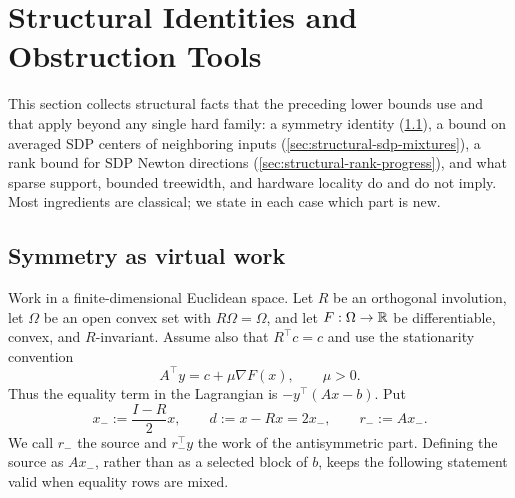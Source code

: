 \section{Structural Identities and Obstruction Tools}
\label{sec:structural-tools}

This section collects structural facts that the preceding lower bounds use
and that apply beyond any single hard family: a symmetry identity
(\cref{sec:structural-symmetry}), a bound on averaged SDP centers of
neighboring inputs (\cref{sec:structural-sdp-mixtures}), a rank bound for
SDP Newton directions (\cref{sec:structural-rank-progress}), and what sparse
support, bounded treewidth, and hardware locality do and do not imply.
Most ingredients are classical; we state in each case which part is new.

\subsection{Symmetry as virtual work}
\label{sec:structural-symmetry}

Work in a finite-dimensional Euclidean space.  Let $R$ be an orthogonal
involution, let $\Omega$ be an open convex set with $R\Omega=\Omega$, and let
$F:\Omega\to\mathbb{R}$ be differentiable, convex, and $R$-invariant.  Assume also
that $R^\top c=c$ and use the stationarity convention
\begin{equation}
 A^\top y=c+\mu\nabla F(x),\qquad \mu>0.                 \label{eq:structural-stationarity}
\end{equation}
Thus the equality term in the Lagrangian is $-y^\top(Ax-b)$.  Put
\begin{equation}
 x_-:=\frac{I-R}{2}x,\qquad d:=x-Rx=2x_-,\qquad r_-:=Ax_-.
                                                               \label{eq:structural-antisymmetric-source}
\end{equation}
We call $r_-$ the source and $r_-^\top y$ the work of the antisymmetric part.
Defining the source as $Ax_-$, rather than as a selected block of $b$, keeps
the following statement valid when equality rows are mixed.

